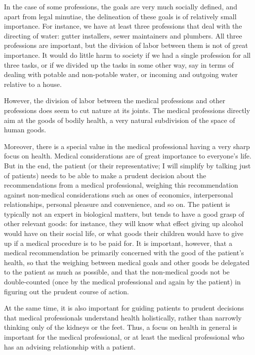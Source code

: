 In the case of some professions, the goals are very much socially defined, and apart from legal minutiae, the delineation of these goals is of relatively
small importance. For instance, we have at least three professions that deal with the directing of water: gutter installers, sewer maintainers and plumbers.
All three professions are important, but the division of labor between them is not of great importance. It would do little harm to society if we had a single
profession for all three tasks, or if we divided up the tasks in some other way, say in terms of dealing with potable and non-potable water, or incoming
and outgoing water relative to a house.

However, the division of labor between the medical professions and other professions does seem to cut nature at its joints. The medical professions directly
aim at the goods of bodily health, a very natural subdivision of the space of human goods.

Moreover, there is a special value in the medical professional
having a very sharp focus on health. Medical considerations are of great importance to everyone's life. But in
the end, the patient (or their representative; I will simplify by talking just of patients) needs to be able to make a prudent decision about the recommendations
from a medical professional, weighing this recommendation against non-medical considerations such as ones of economics, interpersonal relationships, personal
pleasure and convenience, and so on. The patient is typically not an expert in biological matters, but tends to have a good grasp of other relevant goods:
for instance, they will know what effect giving up alcohol would have on their social life, or what goods their children would have to give up if a medical
procedure is to be paid for. It is important, however, that a medical recommendation be primarily concerned with the good of the patient's health, so that
the weighing between medical goals and other goods be delegated to the patient as much as possible, and that the non-medical goods not be double-counted (once by the
medical professional and again by the patient) in figuring out the prudent course of action.

At the same time, it is also important for guiding patients to prudent
decisions that medical professionals understand health holistically, rather than narrowly thinking only of the kidneys or the feet. Thus, a focus on health in general
is important for the medical professional, or at least the medical professional who has an advising relationship with a patient.

